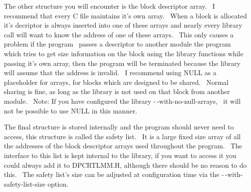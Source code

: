 \documentclass{article}
\begin{document}
\par The other structure you will encounter is the block descriptor
array.~
I recommend that every C file maintains it's own array.~ When a
block
is allocated it's decriptor is always inserted into one of these arrays
and nearly every library call will want to know the address of one of
these
arrays.~ This only causes a problem if the program~ passes a
descriptor to another module the program which tries to get size
information
on the block using the library functions while passing it's own array,
then the program will be terminated because the library will assume
that
the address is invalid.~ I recommend using NULL as a placeholder
for
arrays, for blocks which are designed to be shared.~ Normal
sharing
is fine, as long as the library is not used on that block from another
module.~ Note: If you have configured the library
-$\,$-with-no-null-arrays,~ it will not be possible to use NULL in
this manner.\\

\par The final structure is stored internally and the program should
never
need to access, this structure is called the safety list.~ It is a
large fixed size array of all the addresses of the block descriptor
arrays
used throughout the program.~ The interface to this list is kept
internal
to the library, if you want to access it you could always add it to
DPCRTLMM.H,
although there should be no reason to do this.~ The safety list's
size can be adjusted at configuration time via the
-$\,$-with-safety-list-size option.\\
\end{document}
